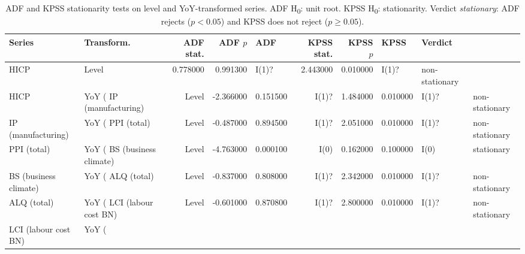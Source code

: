 \begin{table}
\caption{ADF and KPSS stationarity tests on level and YoY-transformed series. ADF H\textsubscript{0}: unit root. KPSS H\textsubscript{0}: stationarity. Verdict \emph{stationary}: ADF rejects ($p<0.05$) and KPSS does not reject ($p\geq0.05$).}
\label{tab:stationaritaet}
\begin{tabular}{llrrlrrll}
\toprule
Series & Transform. & ADF stat. & ADF $p$ & ADF & KPSS stat. & KPSS $p$ & KPSS & Verdict \\
\midrule
HICP & Level & 0.778000 & 0.991300 & I(1)? & 2.443000 & 0.010000 & I(1)? & non-stationary \\
HICP & YoY (%
IP (manufacturing) & Level & -2.366000 & 0.151500 & I(1)? & 1.484000 & 0.010000 & I(1)? & non-stationary \\
IP (manufacturing) & YoY (%
PPI (total) & Level & -0.487000 & 0.894500 & I(1)? & 2.051000 & 0.010000 & I(1)? & non-stationary \\
PPI (total) & YoY (%
BS (business climate) & Level & -4.763000 & 0.000100 & I(0) & 0.162000 & 0.100000 & I(0) & stationary \\
BS (business climate) & YoY (%
ALQ (total) & Level & -0.837000 & 0.808000 & I(1)? & 2.342000 & 0.010000 & I(1)? & non-stationary \\
ALQ (total) & YoY (%
LCI (labour cost BN) & Level & -0.601000 & 0.870800 & I(1)? & 2.800000 & 0.010000 & I(1)? & non-stationary \\
LCI (labour cost BN) & YoY (%
\bottomrule
\end{tabular}
\end{table}
